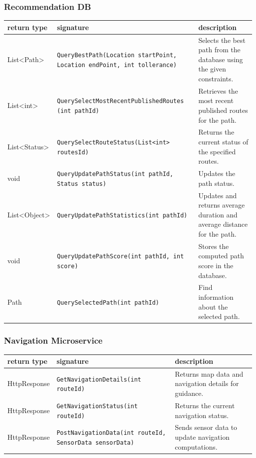 \subsubsection{Recommendation  DB}
\begin{table}[H]
\centering
\small
\begin{tabularx}{\textwidth}{|L{3cm}|L{6.5cm}|Y|}
\hline
\textbf{return type} & \textbf{signature} & \textbf{description} \\
\hline
List<Path> & \texttt{QueryBestPath(Location startPoint, Location endPoint, int tollerance)} & Selects the best path from the database using the given constraints. \\
\hline
List<int> & \texttt{QuerySelectMostRecentPublishedRoutes (int pathId)} & Retrieves the most recent published routes for the path. \\ \hline
List<Status> & \texttt{QuerySelectRouteStatus(List<int> routesId)} & Returns the current status of the specified routes. \\
\hline
void & \texttt{QueryUpdatePathStatus(int pathId, Status status)} & Updates the path status. \\ \hline
List<Object> & \texttt{QueryUpdatePathStatistics(int pathId)} & Updates and returns average duration and average distance for the path. \\ 
\hline
void & \texttt{QueryUpdatePathScore(int pathId, int score)} & Stores the computed path score in the database. \\ 
\hline
Path & \texttt{QuerySelectedPath(int pathId)} & Find information about the selected path. \\ 
\hline
\end{tabularx}
\end{table}
\subsubsection{Navigation Microservice}
\begin{table}[H]
\centering
\small
\begin{tabularx}{\textwidth}{|L{3cm}|L{6.5cm}|Y|}
\hline
\textbf{return type} & \textbf{signature} & \textbf{description} \\
\hline
HttpResponse & \texttt{GetNavigationDetails(int routeId)} & Returns map data and navigation details for guidance. \\
\hline
HttpResponse & \texttt{GetNavigationStatus(int routeId)} & Returns the current navigation status. \\
\hline
HttpResponse & \texttt{PostNavigationData(int routeId, SensorData sensorData)} & Sends sensor data to update navigation computations. \\
\hline
\end{tabularx}
\end{table}
\newpage
